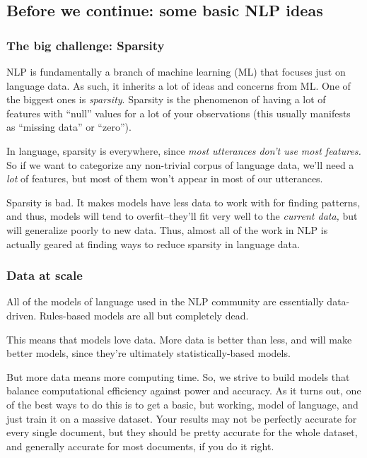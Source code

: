 \documentclass[11pt]{article}
\begin{document}
    \hypertarget{before-we-continue-some-basic-nlp-ideas}{%
\subsection{Before we continue: some basic NLP
ideas}\label{before-we-continue-some-basic-nlp-ideas}}

    \hypertarget{the-big-challenge-sparsity}{%
\subsubsection{The big challenge:
Sparsity}\label{the-big-challenge-sparsity}}

NLP is fundamentally a branch of machine learning (ML) that focuses just
on language data. As such, it inherits a lot of ideas and concerns from
ML. One of the biggest ones is \emph{sparsity}. Sparsity is the
phenomenon of having a lot of features with ``null'' values for a lot of
your observations (this usually manifests as ``missing data'' or
``zero'').

In language, sparsity is everywhere, since \emph{most utterances don't
use most features.} So if we want to categorize any non-trivial corpus
of language data, we'll need a \emph{lot} of features, but most of them
won't appear in most of our utterances.

Sparsity is bad. It makes models have less data to work with for finding
patterns, and thus, models will tend to overfit--they'll fit very well
to the \emph{current data,} but will generalize poorly to new data.
Thus, almost all of the work in NLP is actually geared at finding ways
to reduce sparsity in language data.

    \hypertarget{data-at-scale}{%
\subsubsection{Data at scale}\label{data-at-scale}}

All of the models of language used in the NLP community are essentially
data-driven. Rules-based models are all but completely dead.

This means that models love data. More data is better than less, and
will make better models, since they're ultimately statistically-based
models.

But more data means more computing time. So, we strive to build models
that balance computational efficiency against power and accuracy. As it
turns out, one of the best ways to do this is to get a basic, but
working, model of language, and just train it on a massive dataset. Your
results may not be perfectly accurate for every single document, but
they should be pretty accurate for the whole dataset, and generally
accurate for most documents, if you do it right.
\end{document}
